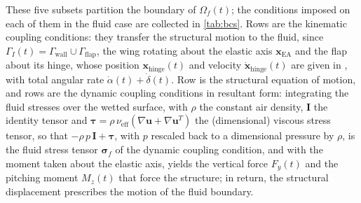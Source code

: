 These five subsets partition the boundary of $\Omega_f(t)$; the conditions imposed on each of them in the fluid case are collected in \cref{tab:bcs}. Rows  are the kinematic coupling conditions: they transfer the structural motion to the fluid, since $\Gamma_I(t) = \Gamma_{\mathrm{wall}} \cup \Gamma_{\mathrm{flap}}$, the wing rotating about the elastic axis $\mathbf x_{\mathrm{EA}}$ and the flap about its hinge, whose position $\mathbf{x}_{\mathrm{hinge}}(t)$ and velocity $\dot{\mathbf{x}}_{\mathrm{hinge}}(t)$ are given in , with total angular rate $\dot\alpha(t)+\dot\delta(t)$. Row  is the structural equation of motion, and rows  are the dynamic coupling conditions in resultant form: integrating the fluid stresses over the wetted surface, with $\rho$ the constant air density, $\mathbf{I}$ the identity tensor and $\boldsymbol{\tau}=\rho\,\nu_{\mathrm{eff}}(\nabla\mathbf u+\nabla\mathbf u^{T})$ the (dimensional) viscous stress tensor, so that $-\rho\,p\,\mathbf{I}+\boldsymbol{\tau}$, with $p$ rescaled back to a dimensional pressure by $\rho$, is the fluid stress tensor $\boldsymbol{\sigma}_{f}$ of the dynamic coupling condition, and with the moment taken about the elastic axis, yields the vertical force $F_{y}(t)$ and the pitching moment $M_{z}(t)$ that force the structure; in return, the structural displacement prescribes the motion of the fluid boundary.

